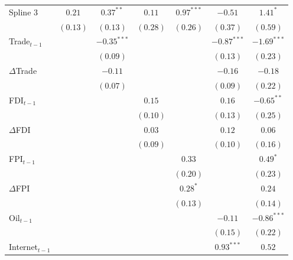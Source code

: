 \documentclass[12pt,a4paper]{article}\usepackage[]{graphicx}\usepackage[]{color}
\begin{document}
{\begin{table}
\begin{center}
\begin{footnotesize}
\begin{tabular}{l c c c c c c }
Spline 3                & $0.21$        & $0.37^{**}$   & $0.11$       & $0.97^{***}$ & $-0.51$       & $1.41^{*}$    \\
                        & $(0.13)$      & $(0.13)$      & $(0.28)$     & $(0.26)$     & $(0.37)$      & $(0.59)$      \\
Trade$_{t-1}$           &               & $-0.35^{***}$ &              &              & $-0.87^{***}$ & $-1.69^{***}$ \\
                        &               & $(0.09)$      &              &              & $(0.13)$      & $(0.23)$      \\
$\Delta$Trade           &               & $-0.11$       &              &              & $-0.16$       & $-0.18$       \\
                        &               & $(0.07)$      &              &              & $(0.09)$      & $(0.22)$      \\
FDI$_{t-1}$             &               &               & $0.15$       &              & $0.16$        & $-0.65^{**}$  \\
                        &               &               & $(0.10)$     &              & $(0.13)$      & $(0.25)$      \\
$\Delta$FDI             &               &               & $0.03$       &              & $0.12$        & $0.06$        \\
                        &               &               & $(0.09)$     &              & $(0.10)$      & $(0.16)$      \\
FPI$_{t-1}$             &               &               &              & $0.33$       &               & $0.49^{*}$    \\
                        &               &               &              & $(0.20)$     &               & $(0.23)$      \\
$\Delta$FPI             &               &               &              & $0.28^{*}$   &               & $0.24$        \\
                        &               &               &              & $(0.13)$     &               & $(0.14)$      \\
Oil$_{t-1}$             &               &               &              &              & $-0.11$       & $-0.86^{***}$ \\
                        &               &               &              &              & $(0.15)$      & $(0.22)$      \\
Internet$_{t-1}$        &               &               &              &              & $0.93^{***}$  & $0.52$        \\

\end{tabular}
\end{footnotesize}
\end{center}
\end{table}}
\end{document}
